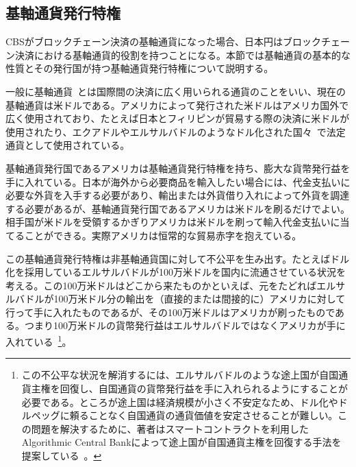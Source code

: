 \documentclass[dvipdfmx,a4paper]{jsarticle}
\begin{document}
\subsection{基軸通貨発行特権}

CBSがブロックチェーン決済の基軸通貨になった場合、日本円はブロックチェーン決済における基軸通貨的役割を持つことになる。本節では基軸通貨の基本的な性質とその発行国が持つ基軸通貨発行特権について説明する。

一般に基軸通貨~\cite{monetarytheory,robert2004international}とは国際間の決済に広く用いられる通貨のことをいい、現在の基軸通貨は米ドルである。アメリカによって発行された米ドルはアメリカ国外で広く使用されており、たとえば日本とフィリピンが貿易する際の決済に米ドルが使用されたり、エクアドルやエルサルバドルのようなドル化された国々~\cite{calvo2002dollarization,selgin2005currency}で法定通貨として使用されている。

基軸通貨発行国であるアメリカは基軸通貨発行特権を持ち、膨大な貨幣発行益を手に入れている。日本が海外から必要商品を輸入したい場合には、代金支払いに必要な外貨を入手する必要があり、輸出または外貨借り入れによって外貨を調達する必要があるが、基軸通貨発行国であるアメリカは米ドルを刷るだけでよい。相手国が米ドルを受領するかぎりアメリカは米ドルを刷って輸入代金支払いに当てることができる。実際アメリカは恒常的な貿易赤字を抱えている。

この基軸通貨発行特権は非基軸通貨国に対して不公平を生み出す。たとえばドル化を採用しているエルサルバドルが100万米ドルを国内に流通させている状況を考える。この100万米ドルはどこから来たものかといえば、元をたどればエルサルバドルが100万米ドル分の輸出を（直接的または間接的に）アメリカに対して行って手に入れたものであるが、その100万米ドルはアメリカが刷ったものである。つまり100万米ドルの貨幣発行益はエルサルバドルではなくアメリカが手に入れている~\footnote{この不公平な状況を解消するには、エルサルバドルのような途上国が自国通貨主権を回復し、自国通貨の貨幣発行益を手に入れられるようにすることが必要である。ところが途上国は経済規模が小さく不安定なため、ドル化やドルペッグに頼ることなく自国通貨の通貨価値を安定させることが難しい。この問題を解決するために、著者はスマートコントラクトを利用したAlgorithmic Central Bankによって途上国が自国通貨主権を回復する手法を提案している~\cite{johnlawcoinacb}。}。
\end{document}
